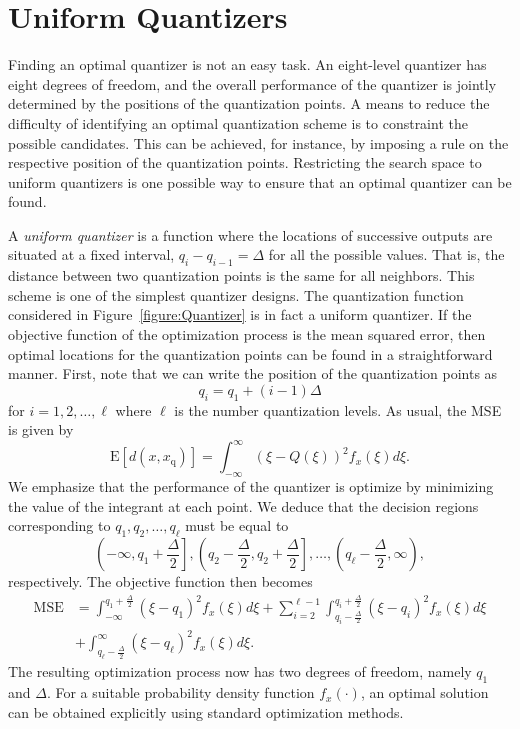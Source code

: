 \section{Uniform Quantizers}
\label{section:UniformQuantizers}

Finding an optimal quantizer is not an easy task.
An eight-level quantizer has eight degrees of freedom, and the overall performance of the quantizer is jointly determined by the positions of the quantization points.
A means to reduce the difficulty of identifying an optimal quantization scheme is to constraint the possible candidates.
This can be achieved, for instance, by imposing a rule on the respective position of the quantization points.
Restricting the search space to uniform quantizers is one possible way to ensure that an optimal quantizer can be found.

A \emph{uniform quantizer} is a function where the locations of successive outputs are situated at a fixed interval, $q_i - q_{i-1} = \Delta$ for all the possible values.
That is, the distance between two quantization points is the same for all neighbors.
This scheme is one of the simplest quantizer designs.
The quantization function considered in Figure~\ref{figure:Quantizer} is in fact a uniform quantizer.
If the objective function of the optimization process is the mean squared error, then optimal locations for the quantization points can be found in a straightforward manner.
First, note that we can write the position of the quantization points as
\begin{equation*}
q_i = q_1 + (i-1) \Delta
\end{equation*}
for $i = 1, 2, \ldots, \ell$ where $\ell$ is the number quantization levels.
As usual, the MSE is given by
\begin{equation*}
\mathrm{E} [ d(x, x_{\mathrm{q}}) ]
= \int_{-\infty}^{\infty} (\xi - Q(\xi))^2 f_x(\xi) d\xi .
\end{equation*}
We emphasize  that the performance of the quantizer is optimize by minimizing the value of the integrant at each point.
We deduce that the decision regions corresponding to $q_1, q_2, \ldots, q_{\ell}$ must be equal to
\begin{equation*}
\left( - \infty, q_1 + \frac{\Delta}{2} \right],
\left( q_2 - \frac{\Delta}{2}, q_2 + \frac{\Delta}{2} \right],
\ldots,
\left( q_{\ell} - \frac{\Delta}{2}, \infty \right) ,
\end{equation*}
respectively.
The objective function then becomes
\begin{equation} \label{equation:UniformQuantizerMSE}
\begin{split}
\text{MSE} &= \int_{-\infty}^{q_1 + \frac{\Delta}{2}} (\xi - q_1)^2 f_x(\xi) d\xi
+ \sum_{i=2}^{{\ell}-1}
\int_{q_i - \frac{\Delta}{2}}^{q_i + \frac{\Delta}{2}}
(\xi - q_i)^2 f_x(\xi) d\xi \\
&+ \int_{q_{\ell} - \frac{\Delta}{2}}^{\infty} (\xi - q_{\ell})^2 f_x(\xi) d\xi .
\end{split}
\end{equation}
The resulting optimization process now has two degrees of freedom, namely $q_1$ and $\Delta$.
For a suitable probability density function $f_x(\cdot)$, an optimal solution can be obtained explicitly using standard optimization methods.

